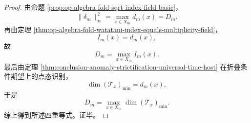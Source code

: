 \begin{proof}
由命题 \ref{prop:op-algebra-fold-sqrt-index-field-basic}，
\[
\|\delta_m\|_\infty^{\,2}
=
\max_{x\in X_m}d_m(x)
=
D_m.
\]
再由定理 \ref{thm:op-algebra-fold-watatani-index-equals-multiplicity-field}，
\[
I_m(x)=d_m(x),
\]
故
\[
D_m=\max_{x\in X_m}I_m(x).
\]
最后由定理 \ref{thm:conclusion-anomaly-strictification-universal-time-host} 在折叠条件期望上的点态识别，
\[
\dim(\mathcal T_x)_{\min}=d_m(x),
\]
于是
\[
D_m=\max_{x\in X_m}\dim(\mathcal T_x)_{\min}.
\]
综上得到所述四重等式。证毕。
\end{proof}
